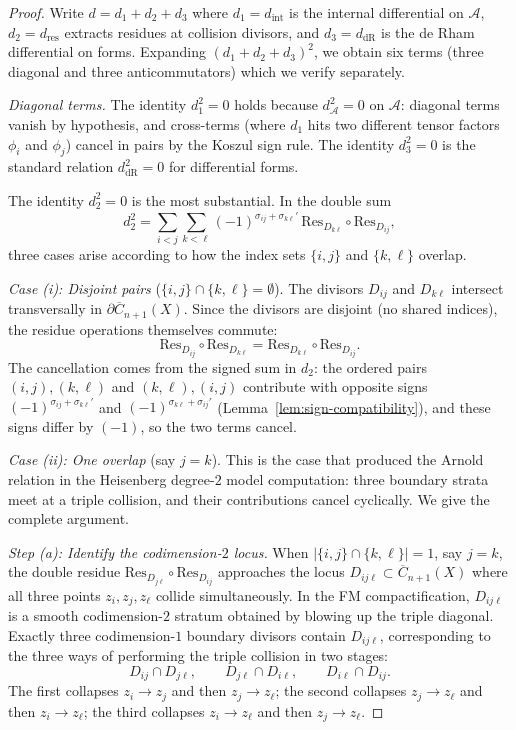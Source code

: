 \begin{proof}
Write $d = d_1 + d_2 + d_3$ where $d_1 = d_{\text{int}}$ is the internal differential on $\mathcal{A}$, $d_2 = d_{\text{res}}$ extracts residues at collision divisors, and $d_3 = d_{\text{dR}}$ is the de Rham differential on forms. Expanding $(d_1 + d_2 + d_3)^2$, we obtain six terms (three diagonal and three anticommutators) which we verify separately.

\emph{Diagonal terms.} The identity $d_1^2 = 0$ holds because $d_\mathcal{A}^2 = 0$ on $\mathcal{A}$: diagonal terms vanish by hypothesis, and cross-terms (where $d_1$ hits two different tensor factors $\phi_i$ and $\phi_j$) cancel in pairs by the Koszul sign rule. The identity $d_3^2 = 0$ is the standard relation $d_{\text{dR}}^2 = 0$ for differential forms.

The identity $d_2^2 = 0$ is the most substantial. In the double sum
\[d_2^2 = \sum_{i<j}\sum_{k<\ell} (-1)^{\sigma_{ij} + \sigma_{k\ell}'}\, \text{Res}_{D_{k\ell}} \circ \text{Res}_{D_{ij}},\]
three cases arise according to how the index sets $\{i,j\}$ and $\{k,\ell\}$ overlap.

\emph{Case (i): Disjoint pairs} ($\{i,j\} \cap \{k,\ell\} = \emptyset$). The divisors $D_{ij}$ and $D_{k\ell}$ intersect transversally in $\partial\overline{C}_{n+1}(X)$. Since the divisors are disjoint (no shared indices), the residue operations themselves commute:
\[\text{Res}_{D_{ij}} \circ \text{Res}_{D_{k\ell}} = \text{Res}_{D_{k\ell}} \circ \text{Res}_{D_{ij}}.\]
The cancellation comes from the signed sum in $d_2$: the ordered pairs $(i,j),(k,\ell)$ and $(k,\ell),(i,j)$ contribute with opposite signs $(-1)^{\sigma_{ij}+\sigma_{k\ell}'}$ and $(-1)^{\sigma_{k\ell}+\sigma_{ij}'}$ (Lemma~\ref{lem:sign-compatibility}), and these signs differ by $(-1)$, so the two terms cancel.

\emph{Case (ii): One overlap} (say $j = k$).
This is the case that produced the Arnold relation in the
Heisenberg degree-$2$ model computation: three boundary strata meet
at a triple collision, and their contributions cancel cyclically.
We give the complete argument.

\smallskip
\emph{Step (a): Identify the codimension-$2$ locus.}
When $|\{i,j\}\cap\{k,\ell\}|=1$, say $j=k$, the
double residue $\text{Res}_{D_{j\ell}}\circ\text{Res}_{D_{ij}}$
approaches the locus $D_{ij\ell} \subset
\overline{C}_{n+1}(X)$ where all three points $z_i,z_j,z_\ell$
collide simultaneously. In the FM compactification, $D_{ij\ell}$
is a smooth codimension-$2$ stratum obtained by blowing up the
triple diagonal. Exactly three codimension-$1$ boundary
divisors contain $D_{ij\ell}$, corresponding to the three
ways of performing the triple collision in two stages:
\[
D_{ij}\cap D_{j\ell}, \qquad
D_{j\ell}\cap D_{i\ell}, \qquad
D_{i\ell}\cap D_{ij}.
\]
The first collapses $z_i\to z_j$ and then $z_j\to z_\ell$;
the second collapses $z_j\to z_\ell$ and then $z_i\to z_\ell$;
the third collapses $z_i\to z_\ell$ and then $z_j\to z_\ell$.


\end{proof}
